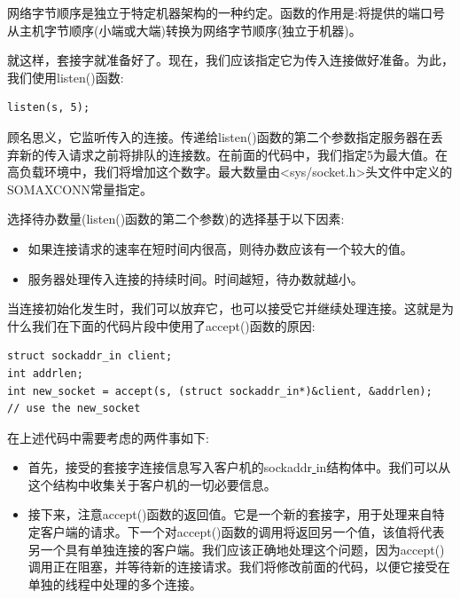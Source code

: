 网络字节顺序是独立于特定机器架构的一种约定。函数的作用是:将提供的端口号从主机字节顺序(小端或大端)转换为网络字节顺序(独立于机器)。 \par
就这样，套接字就准备好了。现在，我们应该指定它为传入连接做好准备。为此，我们使用listen()函数: \par

\begin{lstlisting}[caption={}]
listen(s, 5);
\end{lstlisting}

顾名思义，它监听传入的连接。传递给listen()函数的第二个参数指定服务器在丢弃新的传入请求之前将排队的连接数。在前面的代码中，我们指定5为最大值。在高负载环境中，我们将增加这个数字。最大数量由<sys/socket.h>头文件中定义的SOMAXCONN常量指定。 \par
选择待办数量(listen()函数的第二个参数)的选择基于以下因素: \par

\begin{itemize}
	\item 如果连接请求的速率在短时间内很高，则待办数应该有一个较大的值。
	\item 服务器处理传入连接的持续时间。时间越短，待办数就越小。
\end{itemize}

当连接初始化发生时，我们可以放弃它，也可以接受它并继续处理连接。这就是为什么我们在下面的代码片段中使用了accept()函数的原因: \par

\begin{lstlisting}[caption={}]
struct sockaddr_in client;
int addrlen;
int new_socket = accept(s, (struct sockaddr_in*)&client, &addrlen);
// use the new_socket
\end{lstlisting}

在上述代码中需要考虑的两件事如下: \par

\begin{itemize}
	\item 首先，接受的套接字连接信息写入客户机的sockaddr\underline{ }in结构体中。我们可以从这个结构中收集关于客户机的一切必要信息。
	\item 接下来，注意accept()函数的返回值。它是一个新的套接字，用于处理来自特定客户端的请求。下一个对accept()函数的调用将返回另一个值，该值将代表另一个具有单独连接的客户端。我们应该正确地处理这个问题，因为accept()调用正在阻塞，并等待新的连接请求。我们将修改前面的代码，以便它接受在单独的线程中处理的多个连接。
\end{itemize}

